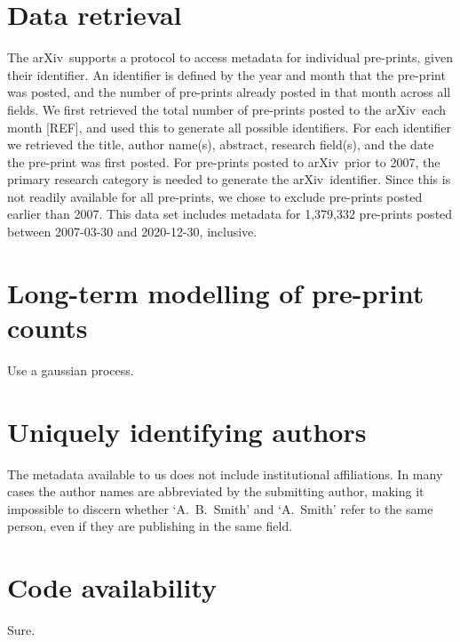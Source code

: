 \documentclass{nature}
\newcommand{\arxiv}{arXiv}
\begin{document}
\begin{methods}

\section*{Data retrieval}

The \arxiv\ supports a protocol to access metadata for individual pre-prints, given their identifier. An identifier is defined by the year and month that the pre-print was posted, and the number of pre-prints already posted in that month across all fields. We first retrieved the total number of pre-prints posted to the \arxiv\ each month [REF], and used this to generate all possible identifiers. For each identifier we retrieved the title, author name(s), abstract, research field(s), and the date the pre-print was first posted. For pre-prints posted to \arxiv\ prior to 2007, the primary research category is needed to generate the \arxiv\ identifier. Since this is not readily available for all pre-prints, we chose to exclude pre-prints posted earlier than 2007. This data set includes metadata for 1,379,332 pre-prints posted between 2007-03-30 and 2020-12-30, inclusive.


\section*{Long-term modelling of pre-print counts}

Use a gaussian process.


\section*{Uniquely identifying authors}

The metadata available to us does not include institutional affiliations. In many cases the author names are abbreviated by the submitting author, making it impossible to discern whether `A.~B.~Smith' and `A.~Smith' refer to the same person, even if they are publishing in the same field.



\section*{Code availability}
Sure.

\end{methods}




\end{document}
